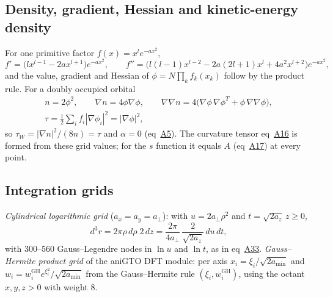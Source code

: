 \documentclass[journal=jctcce,manuscript=suppinfo]{achemso}
\begin{document}
\subsection{Density, gradient, Hessian and kinetic-energy density}
For one primitive factor $f(x)=x^le^{-ax^2}$,
\begin{equation}
f'=\bigl(lx^{l-1}-2ax^{l+1}\bigr)e^{-ax^2},\qquad
f''=\bigl(l(l-1)x^{l-2}-2a(2l+1)x^{l}+4a^2x^{l+2}\bigr)e^{-ax^2},
\label{eq:ani-deriv}
\end{equation}
and the value, gradient and Hessian of $\phi=N\prod_kf_k(x_k)$ follow by the
product rule.  For a doubly occupied orbital
\begin{equation}
\begin{gathered}
n=2\phi^2,\qquad \nabla n=4\phi\nabla\phi,\qquad
\nabla\nabla n=4\bigl(\nabla\phi\,\nabla\phi^{T}+\phi\,\nabla\nabla\phi\bigr),\\
\tau=\tfrac12\sum_if_i|\nabla\phi_i|^2=|\nabla\phi|^2,
\end{gathered}
\label{eq:ani-fields}
\end{equation}
so $\tau_W=|\nabla n|^2/(8n)=\tau$ and $\alpha=0$ (eq~\href{main.pdf\#equation.5}{A5}).
The curvature tensor eq~\href{main.pdf\#equation.16}{A16} is formed from these grid values; for
the $s$ function it equals $A$ (eq~\href{main.pdf\#equation.17}{A17}) at every point.

\subsection{Integration grids}
\emph{Cylindrical logarithmic grid} ($a_x=a_y=a_\perp$): with
$u=2a_\perp\rho^2$ and $t=\sqrt{2a_z}\,z\ge0$,
\begin{equation}
d^3r=2\pi\rho\,d\rho\;2\,dz=\frac{2\pi}{4a_\perp}\,\frac{2}{\sqrt{2a_z}}\,du\,dt,
\label{eq:ani-cyl}
\end{equation}
with 300--560 Gauss--Legendre nodes in $\ln u$ and $\ln t$, as in
eq~\href{main.pdf\#equation.33}{A33}.  \emph{Gauss--Hermite product grid} of the aniGTO DFT
module: per axis $x_i=\xi_i/\sqrt{2a_{\min}}$ and
$w_i=w_i^{\mathrm{GH}}e^{\xi_i^2}/\sqrt{2a_{\min}}$ from the Gauss--Hermite rule
$(\xi_i,w_i^{\mathrm{GH}})$, using the octant $x,y,z>0$ with weight 8.
\end{document}
